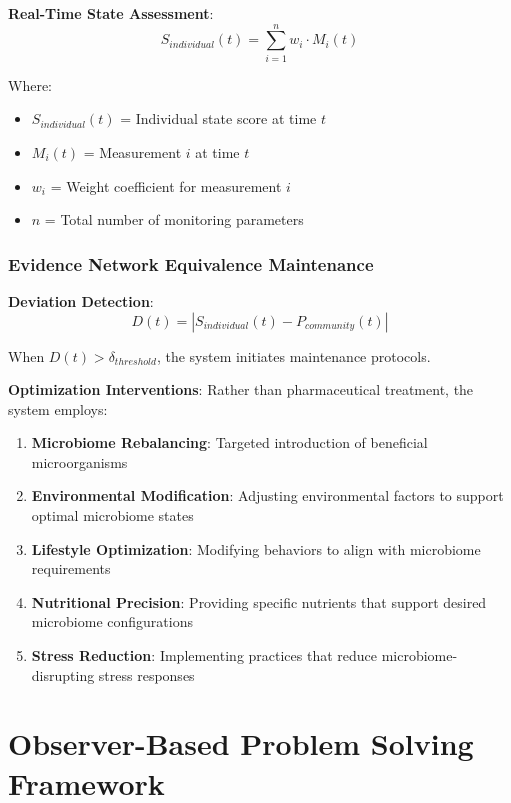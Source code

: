 \documentclass[12pt,a4paper]{article}
\begin{document}
\textbf{Real-Time State Assessment}:
\begin{equation}
S_{individual}(t) = \sum_{i=1}^{n} w_i \cdot M_i(t)
\end{equation}

Where:
\begin{itemize}
\item $S_{individual}(t)$ = Individual state score at time $t$
\item $M_i(t)$ = Measurement $i$ at time $t$
\item $w_i$ = Weight coefficient for measurement $i$
\item $n$ = Total number of monitoring parameters
\end{itemize}

\subsubsection{Evidence Network Equivalence Maintenance}

\textbf{Deviation Detection}:
\begin{equation}
D(t) = |S_{individual}(t) - P_{community}(t)|
\end{equation}

When $D(t) > \delta_{threshold}$, the system initiates maintenance protocols.

\textbf{Optimization Interventions}:
Rather than pharmaceutical treatment, the system employs:

\begin{enumerate}
\item \textbf{Microbiome Rebalancing}: Targeted introduction of beneficial microorganisms
\item \textbf{Environmental Modification}: Adjusting environmental factors to support optimal microbiome states
\item \textbf{Lifestyle Optimization}: Modifying behaviors to align with microbiome requirements
\item \textbf{Nutritional Precision}: Providing specific nutrients that support desired microbiome configurations
\item \textbf{Stress Reduction}: Implementing practices that reduce microbiome-disrupting stress responses
\end{enumerate}

\section{Observer-Based Problem Solving Framework}
\end{document}
